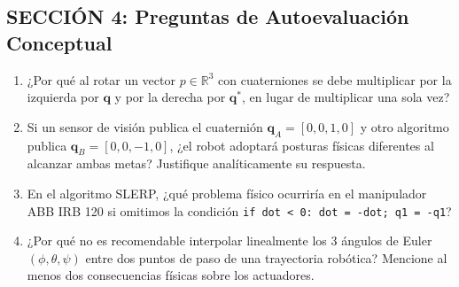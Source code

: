 \documentclass[11pt, a4paper]{article}
\begin{document}
\subsection*{SECCIÓN 4: Preguntas de Autoevaluación Conceptual}
\begin{tcolorbox}[colback=white, colframe=ucbblue, title=Verificación de Conocimientos]
\begin{enumerate}
    \item ¿Por qué al rotar un vector $p \in \mathbb{R}^3$ con cuaterniones se debe multiplicar por la izquierda por $\mathbf{q}$ y por la derecha por $\mathbf{q}^*$, en lugar de multiplicar una sola vez?
    \item Si un sensor de visión publica el cuaternión $\mathbf{q}_A = [0, 0, 1, 0]$ y otro algoritmo publica $\mathbf{q}_B = [0, 0, -1, 0]$, ¿el robot adoptará posturas físicas diferentes al alcanzar ambas metas? Justifique analíticamente su respuesta.
    \item En el algoritmo SLERP, ¿qué problema físico ocurriría en el manipulador ABB IRB 120 si omitimos la condición \texttt{if dot < 0: dot = -dot; q1 = -q1}?
    \item ¿Por qué no es recomendable interpolar linealmente los 3 ángulos de Euler $(\phi, \theta, \psi)$ entre dos puntos de paso de una trayectoria robótica? Mencione al menos dos consecuencias físicas sobre los actuadores.
\end{enumerate}
\end{tcolorbox}
\end{document}
